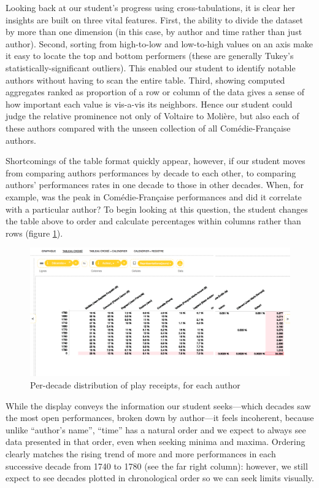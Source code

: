 \documentclass[	DIV=calc,%
							paper=a4,%
							fontsize=11pt,%
							twocolumn]{scrartcl}	 					%
\begin{document}
Looking back at our student’s progress using cross-tabulations, it is clear her insights are built on three vital features.  First, the ability to divide the dataset by more than one dimension (in this case, by author and time rather than just author).  Second, sorting from high-to-low and low-to-high values on an axis make it easy to locate the top and bottom performers (these are generally Tukey’s statistically-significant outliers).  This enabled our student to identify notable authors without having to scan the entire table. Third, showing computed aggregates ranked as proportion of a row or column of the data gives a sense of how important each value is vis-a-vis its neighbors.  Hence our student could judge the relative prominence not only of Voltaire to Molière, but also each of these authors compared with the unseen collection of all Comédie-Française authors.

Shortcomings of the table format quickly appear, however, if our student moves from comparing authors performances by decade to each other, to comparing authors’ performances rates in one decade to those in other decades.  When, for example, was the peak in Comédie-Française performances and did it correlate with a particular author?  To begin looking at this question, the student changes the table above to order and calculate percentages within columns rather than rows (figure \ref{fig:stitched-decades-table}).

\begin{figure}
  \centering
	\includegraphics[width=7in]{steps/stitched-decades-table.png}
	\caption{\color{red}Per-decade distribution of play receipts, for each author}
	\label{fig:stitched-decades-table}
\end{figure}

While the display conveys the information our student seeks—which decades saw the most open performances, broken down by author—it feels incoherent, because unlike ``author’s name'', ``time'' has a natural order and we expect to always see data presented in that order, even when seeking minima and maxima.  Ordering clearly matches the rising trend of more and more performances in each successive decade from 1740 to 1780 (see the far right column): however, we still expect to see decades plotted in chronological order so we can seek limits visually.
\end{document}
